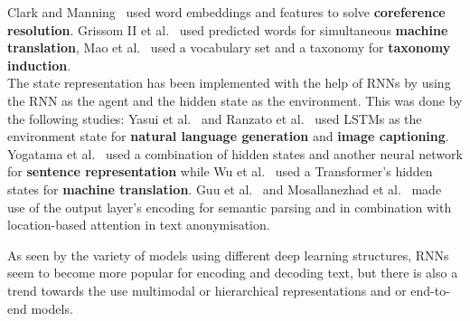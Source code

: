 \documentclass[11pt]{article}
\begin{document}
\begin{itemize}
Clark and Manning~ used word embeddings and features to solve \textbf{coreference resolution}. Grissom II et al.~ used predicted words for simultaneous \textbf{machine translation}, Mao et al.~ used a vocabulary set and a taxonomy for \textbf{taxonomy induction}.\\
The state representation has been implemented with the help of RNNs by using the RNN as the agent and the hidden state as the environment. This was done by the following studies: Yasui et al.~ and Ranzato et al.~ used LSTMs as the environment state for \textbf{natural language generation} and \textbf{image captioning}. \\ Yogatama et al.~ used a combination of hidden states and another neural network for \textbf{sentence representation} while Wu et al.~ used a Transformer's hidden states for \textbf{machine translation}. Guu et al.~ and Mosallanezhad et al.~ made use of the output layer's encoding for semantic parsing and in combination with location-based attention in text anonymisation.
\end{itemize}

As seen by the variety of models using different deep learning structures, RNNs seem to become more popular for encoding and decoding text, but there is also a trend towards the use multimodal or hierarchical representations and or end-to-end models.
\end{document}
